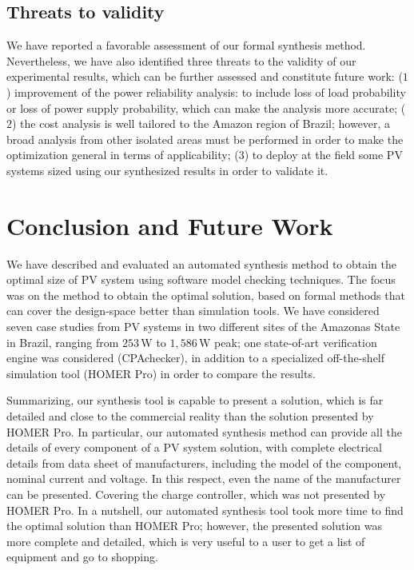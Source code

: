 \documentclass[journal]{IEEEtran}
\begin{document}
\subsection{Threats to validity}

We have reported a favorable assessment of our formal synthesis method. 
Nevertheless, we have also identified three threats to the validity 
of our experimental results, which can be further assessed and 
constitute future work: ($1$) improvement of the power reliability 
analysis: to include loss of load probability or loss of power 
supply probability, which can make the analysis more accurate; 
($2$) the cost analysis is well tailored to the Amazon region of Brazil; 
however, a broad analysis from other isolated areas must be 
performed in order to make the optimization general in terms 
of applicability; ($3$) to deploy at the field some PV systems 
sized using our synthesized results in order to validate it.

\section{Conclusion and Future Work}
\label{sec:Conclusion}

We have described and evaluated an automated synthesis method to obtain the optimal size of PV system using software model checking techniques. The focus was on the method to obtain the optimal solution, based on formal methods that can cover the design-space better than simulation tools. We have considered seven case studies from PV systems in two different sites of the Amazonas State in Brazil, ranging from $253$\,W to $1,586$\,W peak; one state-of-art verification engine was considered (CPAchecker), in addition to a specialized off-the-shelf simulation tool (HOMER Pro) in order to compare the results.

Summarizing, our synthesis tool is capable to present a solution, which is far detailed and close to the commercial reality than the solution presented by HOMER Pro. In particular, our automated synthesis method can provide all the details of every component of a PV system solution, with complete electrical details from data sheet of manufacturers, including the model of the component, nominal current and voltage. In this respect, even the name of the manufacturer can be presented. Covering the charge controller, which was not presented by HOMER Pro. In a nutshell, our automated synthesis tool took more time to find the optimal solution than HOMER Pro; however, the presented solution was more complete and detailed, which is very useful to a user to get a list of equipment and go to shopping.
\end{document}
